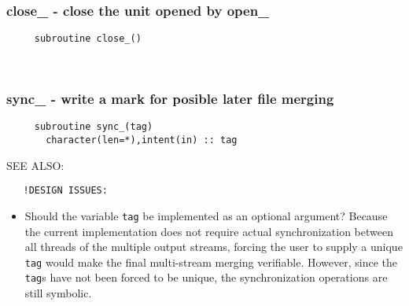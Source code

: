  
\mbox{}\hrulefill\ 
 
  \subsubsection{close\_ - close the unit opened by open\_}

\begin{verbatim} 
     subroutine close_()
 \end{verbatim}%
 
 
\mbox{}\hrulefill\ 

  \subsubsection{sync\_ - write a mark for posible later file merging}

\begin{verbatim} 
     subroutine sync_(tag)
       character(len=*),intent(in) :: tag
 \end{verbatim}%
{\sf SEE ALSO:}
\begin{verbatim}
   !DESIGN ISSUES:
\end{verbatim}
   \begin{itemize}
   \item	Should the variable \verb"tag" be implemented as an optional
  	argument?  Because the current implementation does not require
  	actual synchronization between all threads of the multiple
  	output streams, forcing the user to supply a unique \verb"tag"
  	would make the final multi-stream merging verifiable.  However,
  	since the \verb"tag"s have not been forced to be unique, the
  	synchronization operations are still symbolic.
  	
   \end{itemize}
 
